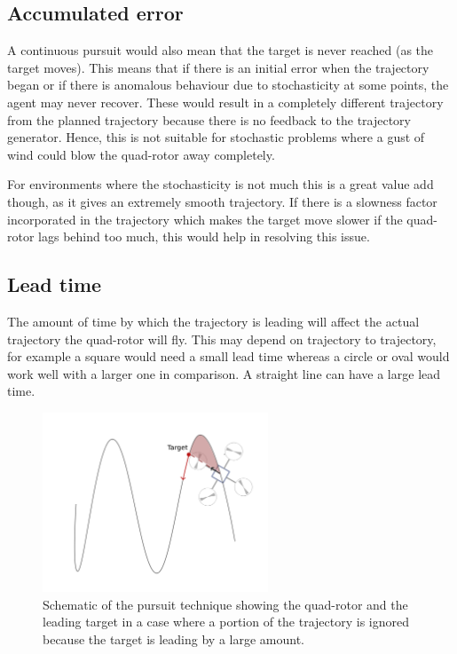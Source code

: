 \documentclass[hidelinks,BTech]{iitmdiss}
\begin{document}
\subsection{Accumulated error}
A continuous pursuit would also mean that the target is never reached (as the target moves). This means that if there is an initial error when the trajectory began or if there is anomalous behaviour due to stochasticity at some points, the agent may never recover. These would result in a completely different trajectory from the planned trajectory because there is no feedback to the trajectory generator. Hence, this is not suitable for stochastic problems where a gust of wind could blow the quad-rotor away completely.

For environments where the stochasticity is not much this is a great value add though, as it gives an extremely smooth trajectory. If there is a slowness factor incorporated in the trajectory which makes the target move slower if the quad-rotor lags behind too much, this would help in resolving this issue.

\subsection{Lead time}
The amount of time by which the trajectory is leading will affect the actual trajectory the quad-rotor will fly. This may depend on trajectory to trajectory, for example a square would need a small lead time whereas a circle or oval would work well with a larger one in comparison. A straight line can have a large lead time.

\begin{figure}[H]
  \centering
    \includegraphics[width=0.6\textwidth]{pursuit_con.png}
    \caption{Schematic of the pursuit technique showing the quad-rotor and the leading target in a case where a portion of the trajectory is ignored because the target is leading by a large amount.}
\end{figure}
\end{document}
